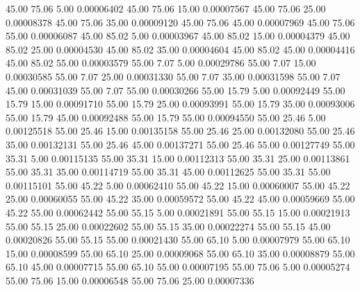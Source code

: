      45.00     75.06      5.00     0.00006402
     45.00     75.06     15.00     0.00007567
     45.00     75.06     25.00     0.00008378
     45.00     75.06     35.00     0.00009120
     45.00     75.06     45.00     0.00007969
     45.00     75.06     55.00     0.00006087
     45.00     85.02      5.00     0.00003967
     45.00     85.02     15.00     0.00004379
     45.00     85.02     25.00     0.00004530
     45.00     85.02     35.00     0.00004604
     45.00     85.02     45.00     0.00004416
     45.00     85.02     55.00     0.00003579
     55.00      7.07      5.00     0.00029786
     55.00      7.07     15.00     0.00030585
     55.00      7.07     25.00     0.00031330
     55.00      7.07     35.00     0.00031598
     55.00      7.07     45.00     0.00031039
     55.00      7.07     55.00     0.00030266
     55.00     15.79      5.00     0.00092449
     55.00     15.79     15.00     0.00091710
     55.00     15.79     25.00     0.00093991
     55.00     15.79     35.00     0.00093006
     55.00     15.79     45.00     0.00092488
     55.00     15.79     55.00     0.00094550
     55.00     25.46      5.00     0.00125518
     55.00     25.46     15.00     0.00135158
     55.00     25.46     25.00     0.00132080
     55.00     25.46     35.00     0.00132131
     55.00     25.46     45.00     0.00137271
     55.00     25.46     55.00     0.00127749
     55.00     35.31      5.00     0.00115135
     55.00     35.31     15.00     0.00112313
     55.00     35.31     25.00     0.00113861
     55.00     35.31     35.00     0.00114719
     55.00     35.31     45.00     0.00112625
     55.00     35.31     55.00     0.00115101
     55.00     45.22      5.00     0.00062410
     55.00     45.22     15.00     0.00060007
     55.00     45.22     25.00     0.00060055
     55.00     45.22     35.00     0.00059572
     55.00     45.22     45.00     0.00059669
     55.00     45.22     55.00     0.00062442
     55.00     55.15      5.00     0.00021891
     55.00     55.15     15.00     0.00021913
     55.00     55.15     25.00     0.00022602
     55.00     55.15     35.00     0.00022274
     55.00     55.15     45.00     0.00020826
     55.00     55.15     55.00     0.00021430
     55.00     65.10      5.00     0.00007979
     55.00     65.10     15.00     0.00008599
     55.00     65.10     25.00     0.00009068
     55.00     65.10     35.00     0.00008879
     55.00     65.10     45.00     0.00007715
     55.00     65.10     55.00     0.00007195
     55.00     75.06      5.00     0.00005274
     55.00     75.06     15.00     0.00006548
     55.00     75.06     25.00     0.00007336
